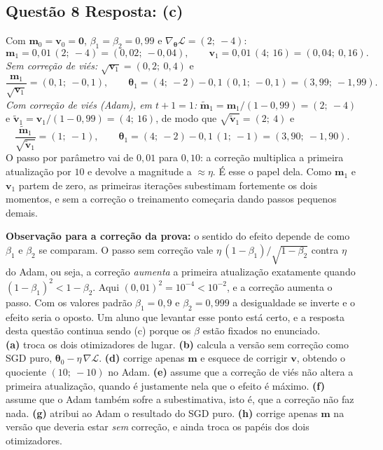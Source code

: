 \documentclass[11pt,a4paper]{article}
\begin{document}
\subsection*{Questão 8 \textemdash{} Resposta: (c)}
Com $\mathbf{m}_0 = \mathbf{v}_0 = \mathbf{0}$, $\beta_1 = \beta_2 = 0{,}99$ e $\nabla_{\boldsymbol{\theta}}\mathcal{L} = (2;\ -4)$:
\[
\mathbf{m}_1 = 0{,}01\,(2;\ -4) = (0{,}02;\ -0{,}04),
\qquad
\mathbf{v}_1 = 0{,}01\,(4;\ 16) = (0{,}04;\ 0{,}16).
\]
\textit{Sem correção de viés:} $\sqrt{\mathbf{v}_1} = (0{,}2;\ 0{,}4)$ e
\[
\frac{\mathbf{m}_1}{\sqrt{\mathbf{v}_1}} = (0{,}1;\ -0{,}1),
\qquad
\boldsymbol{\theta}_1 = (4;\ -2) - 0{,}1\,(0{,}1;\ -0{,}1) = (3{,}99;\ -1{,}99).
\]
\textit{Com correção de viés (Adam), em $t + 1 = 1$:} $\widetilde{\mathbf{m}}_1 = \mathbf{m}_1/(1 - 0{,}99) = (2;\ -4)$ e $\widetilde{\mathbf{v}}_1 = \mathbf{v}_1/(1 - 0{,}99) = (4;\ 16)$, de modo que $\sqrt{\widetilde{\mathbf{v}}_1} = (2;\ 4)$ e
\[
\frac{\widetilde{\mathbf{m}}_1}{\sqrt{\widetilde{\mathbf{v}}_1}} = (1;\ -1),
\qquad
\boldsymbol{\theta}_1 = (4;\ -2) - 0{,}1\,(1;\ -1) = (3{,}90;\ -1{,}90).
\]
O passo por parâmetro vai de $0{,}01$ para $0{,}10$: a correção multiplica a primeira atualização por $10$ e devolve a magnitude a $\approx \eta$. É esse o papel dela. Como $\mathbf{m}_1$ e $\mathbf{v}_1$ partem de zero, as primeiras iterações subestimam fortemente os dois momentos, e sem a correção o treinamento começaria dando passos pequenos demais.

\textbf{Observação para a correção da prova:} o sentido do efeito depende de como $\beta_1$ e $\beta_2$ se comparam. O passo sem correção vale $\eta\,(1-\beta_1)/\sqrt{1-\beta_2}$ contra $\eta$ do Adam, ou seja, a correção \emph{aumenta} a primeira atualização exatamente quando $(1-\beta_1)^2 < 1-\beta_2$. Aqui $(0{,}01)^2 = 10^{-4} < 10^{-2}$, e a correção aumenta o passo. Com os valores padrão $\beta_1 = 0{,}9$ e $\beta_2 = 0{,}999$ a desigualdade se inverte e o efeito seria o oposto. Um aluno que levantar esse ponto está certo, e a resposta desta questão continua sendo (c) porque os $\beta$ estão fixados no enunciado.\\
\textbf{(a)} troca os dois otimizadores de lugar.
\textbf{(b)} calcula a versão sem correção como SGD puro, $\boldsymbol{\theta}_0 - \eta\,\nabla\mathcal{L}$.
\textbf{(d)} corrige apenas $\mathbf{m}$ e esquece de corrigir $\mathbf{v}$, obtendo o quociente $(10;\ -10)$ no Adam.
\textbf{(e)} assume que a correção de viés não altera a primeira atualização, quando é justamente nela que o efeito é máximo.
\textbf{(f)} assume que o Adam também sofre a subestimativa, isto é, que a correção não faz nada.
\textbf{(g)} atribui ao Adam o resultado do SGD puro.
\textbf{(h)} corrige apenas $\mathbf{m}$ na versão que deveria estar \emph{sem} correção, e ainda troca os papéis dos dois otimizadores.
\end{document}
